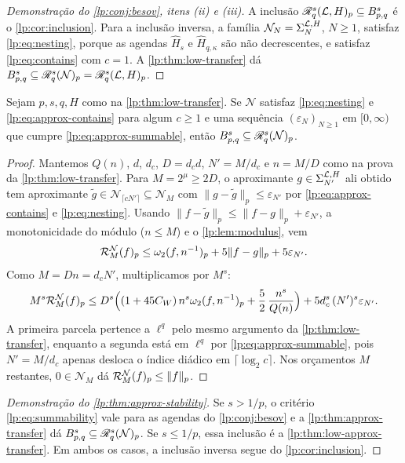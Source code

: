 \documentclass[12pt,a4paper]{article}
\begin{document}
\begin{proof}[Demonstração do \cref{lp:conj:besov}, itens (ii) e (iii)]
A inclusão $\mathscr R^{s}_{q}(\mathcal L,H)_p\subseteq B^{s}_{p,q}$ é o \cref{lp:cor:inclusion}. Para a inclusão inversa, a família $\mathcal N_N=\Sigma_{N}^{\mathcal L,H}$, $N\ge1$, satisfaz \eqref{lp:eq:nesting}, porque as agendas $\widehat H_s$ e $\widehat H_{q,\kappa}$ são não decrescentes, e satisfaz \eqref{lp:eq:contains} com $c=1$. A \cref{lp:thm:low-transfer} dá $B^{s}_{p,q}\subseteq\mathscr R^{s}_{q}(\mathcal N)_p=\mathscr R^{s}_{q}(\mathcal L,H)_p$.
\end{proof}

\begin{proposicao}
\label{lp:thm:low-approx-transfer}
Sejam $p,s,q,H$ como na \cref{lp:thm:low-transfer}. Se $\mathcal N$ satisfaz \eqref{lp:eq:nesting} e \eqref{lp:eq:approx-contains} para algum $c\ge1$ e uma sequência $(\varepsilon_N)_{N\ge1}$ em $[0,\infty)$ que cumpre \eqref{lp:eq:approx-summable}, então $B^{s}_{p,q}\subseteq\mathscr R^{s}_{q}(\mathcal N)_p$.
\end{proposicao}

\begin{proof}
Mantemos $Q(n)$, $d$, $d_c$, $D=d_cd$, $N'=M/d_c$ e $n=M/D$ como na prova da \cref{lp:thm:low-transfer}. Para $M=2^\mu\ge2D$, o aproximante $g\in\Sigma_{N'}^{\mathcal L,H}$ ali obtido tem aproximante $\tilde g\in\mathcal N_{\lceil cN'\rceil}\subseteq\mathcal N_M$ com $\|g-\tilde g\|_p\le\varepsilon_{N'}$ por \eqref{lp:eq:approx-contains} e \eqref{lp:eq:nesting}. Usando $\|f-\tilde g\|_p\le\|f-g\|_p+\varepsilon_{N'}$, a monotonicidade do módulo ($n\le M$) e o \cref{lp:lem:modulus}, vem
\[
 \mathcal R^{\mathcal N}_{M}(f)_p
 \le\omega_2(f,n^{-1})_{p}+5\|f-g\|_p+5\varepsilon_{N'}.
\]
Como $M=Dn=d_cN'$, multiplicamos por $M^s$:
\[
 M^s\mathcal R^{\mathcal N}_{M}(f)_p
 \le D^s\Bigl((1+45C_W)\,n^s\omega_2(f,n^{-1})_{p}+\frac52\,\frac{n^s}{Q(n)}\Bigr)+5d_c^s\,(N')^s\varepsilon_{N'}.
\]
A primeira parcela pertence a $\ell^q$ pelo mesmo argumento da \cref{lp:thm:low-transfer}, enquanto a segunda está em $\ell^q$ por \eqref{lp:eq:approx-summable}, pois $N'=M/d_c$ apenas desloca o índice diádico em $\lceil\log_2c\rceil$. Nos orçamentos $M$ restantes, $0\in\mathcal N_M$ dá $\mathcal R^{\mathcal N}_{M}(f)_p\le\|f\|_p$.
\end{proof}

\begin{proof}[Demonstração do \cref{lp:thm:approx-stability}]
Se $s>1/p$, o critério \eqref{lp:eq:summability} vale para as agendas do \cref{lp:conj:besov} e a \cref{lp:thm:approx-transfer} dá $B^{s}_{p,q}\subseteq\mathscr R^{s}_{q}(\mathcal N)_p$. Se $s\le1/p$, essa inclusão é a \cref{lp:thm:low-approx-transfer}. Em ambos os casos, a inclusão inversa segue do \cref{lp:cor:inclusion}.
\end{proof}
\end{document}
